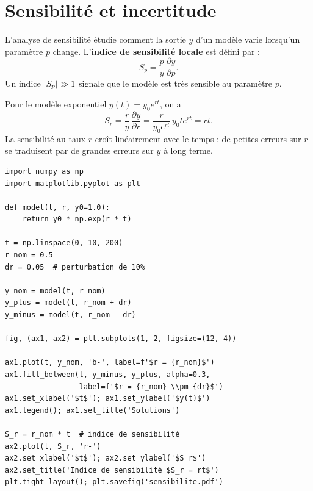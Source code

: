 \section{Sensibilit\'e et incertitude}
\label{sec:sensibilite}

\begin{definition}
L'analyse de sensibilit\'e \'etudie comment la sortie $y$ d'un mod\`ele
varie lorsqu'un param\`etre $p$ change.  L'\textbf{indice de sensibilit\'e
locale} est d\'efini par :
\[
  S_p = \frac{p}{y}\,\frac{\partial y}{\partial p}.
\]
Un indice $\left| S_p \right|\gg 1$ signale que le mod\`ele est tr\`es sensible
au param\`etre $p$.
\end{definition}

\begin{exemple}
Pour le mod\`ele exponentiel $y(t)=y_0 e^{rt}$, on a
\[
  S_r = \frac{r}{y}\,\frac{\partial y}{\partial r}
      = \frac{r}{y_0 e^{rt}}\,y_0 t e^{rt} = rt.
\]
La sensibilit\'e au taux $r$ cro\^it lin\'eairement avec le temps :
de petites erreurs sur $r$ se traduisent par de grandes erreurs
sur $y$ \`a long terme.
\end{exemple}

\begin{codeblock}[title=\textbf{Analyse de sensibilit\'e en Python}]
\begin{verbatim}
import numpy as np
import matplotlib.pyplot as plt

def model(t, r, y0=1.0):
    return y0 * np.exp(r * t)

t = np.linspace(0, 10, 200)
r_nom = 0.5
dr = 0.05  # perturbation de 10%

y_nom = model(t, r_nom)
y_plus = model(t, r_nom + dr)
y_minus = model(t, r_nom - dr)

fig, (ax1, ax2) = plt.subplots(1, 2, figsize=(12, 4))

ax1.plot(t, y_nom, 'b-', label=f'$r = {r_nom}$')
ax1.fill_between(t, y_minus, y_plus, alpha=0.3,
                 label=f'$r = {r_nom} \\pm {dr}$')
ax1.set_xlabel('$t$'); ax1.set_ylabel('$y(t)$')
ax1.legend(); ax1.set_title('Solutions')

S_r = r_nom * t  # indice de sensibilité
ax2.plot(t, S_r, 'r-')
ax2.set_xlabel('$t$'); ax2.set_ylabel('$S_r$')
ax2.set_title('Indice de sensibilité $S_r = rt$')
plt.tight_layout(); plt.savefig('sensibilite.pdf')
\end{verbatim}
\end{codeblock}

